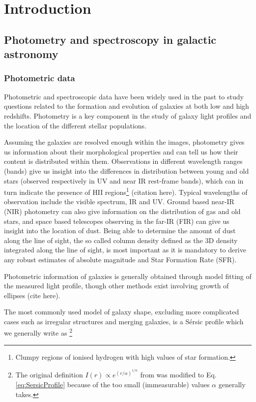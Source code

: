 \clearpage
\section{Introduction}
\label{sec:Intro}

\subsection{Photometry and spectroscopy in galactic astronomy}
\label{subsec:diffPhotSpec}

\subsubsection{Photometric data}
\label{subsubsec:photo_data}

Photometric and spectroscopic data have been widely used in the past to study questions related to the formation and evolution of galaxies at both low and high redshifts. Photometry is a key component in the study of galaxy light profiles and the location of the different stellar populations. 

Assuming the galaxies are resolved enough within the images, photometry gives us information about their morphological properties and can tell us how their content is distributed within them. Observations in different wavelength ranges (bands) give us insight into the differences in distribution between young and old stars (observed respectively in UV and near IR rest-frame bands), which can in turn indicate the presence of HII regions\footnote{Clumpy regions of ionised hydrogen with high values of star formation.} (citation here). Typical wavelengths of observation include the visible spectrum, IR and UV. Ground based near-IR (NIR) photometry can also give information on the distribution of gas and old stars, and space based telescopes observing in the far-IR (FIR) can give us insight into the location of dust. Being able to determine the amount of dust along the line of sight, the so called column density defined as the 3D density integrated along the line of sight, is most important as it is mandatory to derive any robust estimates of absolute magnitude and Star Formation Rate (SFR).


Photometric information of galaxies is generally obtained through model fitting of the measured light profile, though other methods exist involving growth of ellipses (cite here).                      

The most commonly used model of galaxy shape, excluding more complicated cases such as irregular structures and merging galaxies, is a Sérsic profile which we generally write as \footnote{The original definition $I(r) \propto e^{(r/\alpha)^{1/n}}$ from  was modified to Eq.\,\ref{eq:SersicProfile} because of the too small (immeasurable) values $\alpha$ generally takes.} 

